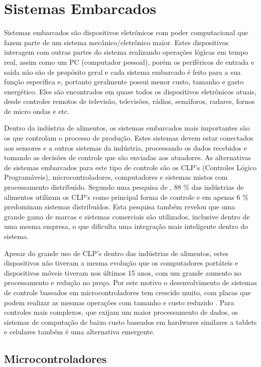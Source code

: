 \section{Sistemas Embarcados}\label{embarcados}

Sistemas embarcados são dispositivos eletrônicos com poder computacional que fazem parte de um sistema mecânico/eletrônico maior. Estes dispositivos interagem com outras partes do sistema realizando operações lógicas em tempo real, assim como um PC (computador pessoal), porém os periféricos de entrada e saída não são de propósito geral e cada sistema embarcado é feito para a sua função específica e, portanto geralmente possui menor custo, tamanho e gasto energético. Eles são encontrados em quase todos os dispositivos eletrônicos atuais, desde controles remotos de televisão, televisões, rádios, semáforos, radares, fornos de micro ondas e etc.

Dentro da indústria de alimentos, os sistemas embarcados mais importantes são os que controlam o processo de produção. Estes sistemas devem estar conectados aos sensores e a outros sistemas da indústria, processando os dados recebidos e tomando as decisões de controle que são enviadas aos atuadores. As alternativas de sistemas embarcados para este tipo de controle são os CLP’s (Controles Lógico Programáveis), microcontroladores, computadores e sistemas mistos com processamento distribuído. Segundo uma pesquisa de \citet{survey-automation}, 88 \% das indústrias de alimentos utilizam os CLP’s como principal forma de controle e em apenas 6 \% predominam sistemas distribuídos. Esta pesquisa também revelou que uma grande gama de marcas e sistemas comerciais são utilizados, inclusive dentro de uma mesma empresa, o que dificulta uma integração mais inteligente dentro do sistema.

Apesar do grande uso de CLP’s dentro das indústrias de alimentos,  estes dispositivos não tiveram a mesma evolução que os computadores portáteis e dispositivos móveis tiveram nos últimos 15 anos, com um grande aumento no processamento e redução no preço. Por este motivo o desenvolvimento de sistemas de controle baseados em microcontroladores tem crescido muito, com placas que podem realizar as mesmas operações com tamanho e custo reduzido \citep{clp-microcontrolador}. Para controles mais complexos, que exijam um maior processamento de dados, os sistemas de computação de baixo custo baseados em hardwares similares a tablets e celulares também é uma alternativa emergente. 

\subsection{Microcontroladores}

